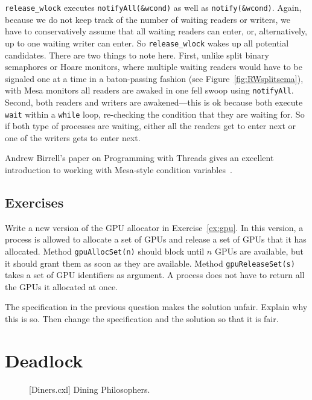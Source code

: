 \documentclass{report}
\newenvironment{code}{
\tcolorbox
}{
\endtcolorbox
}
\begin{document}
\texttt{release\_wlock} executes \texttt{notifyAll(\&wcond)} as well as
\texttt{notify(\&wcond)}.
Again, because we do not keep track of the number of waiting readers or writers, we
have to conservatively assume that all waiting readers can enter, or, alternatively,
up to one waiting writer can enter.  So \texttt{release\_wlock} wakes up all
potential candidates.
There are two things to note here.  First, unlike split binary semaphores or Hoare
monitors, where multiple waiting readers would have to be signaled one at a time in a
baton-passing fashion (see Figure~\ref{fig:RWsplitsema}), with Mesa monitors
all readers are awaked in one fell swoop using \texttt{notifyAll}.
Second, both readers and writers are awakened---this is ok because both execute
\texttt{wait} within a \texttt{while} loop, re-checking the condition that they
are waiting for.  So if both type of processes are waiting, either all the readers
get to enter next or one of the writers gets to enter next.

Andrew Birrell's paper on Programming with Threads gives an excellent
introduction to working with Mesa-style condition variables~\cite{Birrell89}.

\section*{Exercises}
\begin{problems}
\item Write a new version of the GPU allocator in Exercise~\ref{ex:gpu}.
In this version,
a process is allowed to allocate a set of GPUs and release a set of GPUs that it
has allocated.  Method \texttt{gpuAllocSet(n)} should block until $n$ GPUs are
available, but it should grant them as soon as they are available.
Method \texttt{gpuReleaseSet(s)} takes a set of GPU identifiers as argument.
A process does not have to return all the GPUs it allocated at once.
\item The specification in the previous question makes the solution unfair.
Explain why this is so.  Then change the specification and the solution so that
it is fair.
\end{problems}

\chapter{Deadlock}
\label{ch:deadlock}

\begin{figure}
\begin{code}
\end{code}
\caption{[Diners.cxl] Dining Philosophers.}
\label{fig:diners}
\end{figure}
\end{document}

